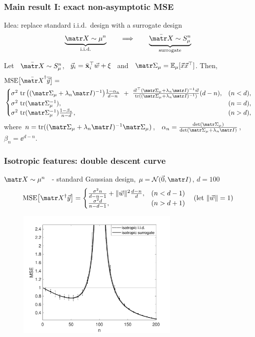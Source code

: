 \begin{frame}
  \frametitle{Main result I: exact non-asymptotic MSE}
  Idea: replace standard i.i.d.~design with a surrogate design
  \begin{align*}
    \underbrace{\X\sim\mu^n}_{\text{i.i.d.}}\qquad\Longrightarrow\qquad
    \underbrace{\Xb\sim S_\mu^n}_{\text{surrogate}} 
  \end{align*}
  \vspace{-2mm}
  \begin{theorem}
\label{t:mse}
Let \ $\Xb\sim S_\mu^n$, \ $\vec{y}_i=\bar{\mathbf x}_i^\top{\vec{w}}+\xi$ \ and \
$\Sigmab_\mu=\E_\mu[\x\x^\top]$. Then,
  \begin{align*}
 &\MSE{\Xb^\dagger\ybb} =\\
  &  \begin{cases}
    \sigma^2\,\tr\big((\Sigmab_\mu+\lambda_n\I)^{-1}\big)
    \frac{1-\alpha_n}{d-n}\ +\
\frac{\w^{\top}(\Sigmab_\mu+\lambda_n\I)^{-1}\w}
{\tr((\Sigmab_\mu+\lambda_n\I)^{-1})}(d-n),
& (n<d),\\
\sigma^2\, \tr(\Sigmab_\mu^{-1}),& (n=d),\\
\sigma^2\,\tr(\Sigmab_\mu^{-1})\frac{1-\beta_n}{n-d},&(n>d),
\end{cases}
  \end{align*}
  where
  $n=\tr((\Sigmab_\mu+\lambda_n\I)^{-1}\Sigmab_\mu)$, \
  $\alpha_n=\frac{\det(\Sigmab_\mu)}{\det(\Sigmab_\mu+\lambda_n\I)}$,
\ $\beta_n=\ee^{d-n}$.
\end{theorem}
\end{frame}

\begin{frame}
  \frametitle{Isotropic features: double descent curve}
  $\X\sim\mu^n$ \ - standard Gaussian design, $\mu=\Nc(\vec{0},\I)$, $d=100$
  \pause
      \begin{align*}
        \MSE{\X^\dagger\y} =
        \begin{cases}
          \frac{\sigma^2n}{d-n-1} + \|\w\|^2\frac{d-n}{d},&(n<d-1)\\
          \frac{\sigma^2d}{n-d-1},&(n>d+1)
        \end{cases}\quad(\text{let }\|\w\|=1)
      \end{align*}
      \pause\vspace{-2mm}
      \begin{figure}
          \centering
          \includegraphics[width=0.7\textwidth]{Figures/descent/descent-isotropic.pdf}
      \end{figure}
\end{frame}

